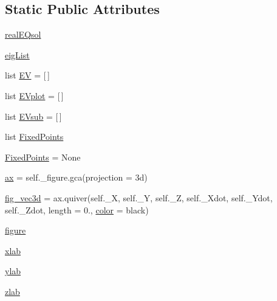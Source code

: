 \subsection*{Static Public Attributes}
\begin{DoxyCompactItemize}
\item 
\hyperlink{class_mu_mo_t_1_1_mu_mo_t_1_1_mu_mo_tvector_view_ab964c8e9f2533c9bf4957faf67de7149}{real\+E\+Qsol}
\item 
\hyperlink{class_mu_mo_t_1_1_mu_mo_t_1_1_mu_mo_tvector_view_ab5666bb0356c5bc211c10fd59723e892}{eig\+List}
\item 
list \hyperlink{class_mu_mo_t_1_1_mu_mo_t_1_1_mu_mo_tvector_view_ab56bd718f01a64e681a8135a8e90946a}{EV} = \mbox{[}$\,$\mbox{]}
\item 
list \hyperlink{class_mu_mo_t_1_1_mu_mo_t_1_1_mu_mo_tvector_view_a424471486fdcd104bad36c06ae6c8640}{E\+Vplot} = \mbox{[}$\,$\mbox{]}
\item 
list \hyperlink{class_mu_mo_t_1_1_mu_mo_t_1_1_mu_mo_tvector_view_a5b825ad4fea91f83e5f0df2bda4278f9}{E\+Vsub} = \mbox{[}$\,$\mbox{]}
\item 
list \hyperlink{class_mu_mo_t_1_1_mu_mo_t_1_1_mu_mo_tvector_view_aac20660098bbbe33ab90f9c880b2fa8c}{Fixed\+Points}
\item 
\hyperlink{class_mu_mo_t_1_1_mu_mo_t_1_1_mu_mo_tvector_view_a7a971a839d61106558ebf0453849cfd1}{Fixed\+Points} = None
\item 
\hyperlink{class_mu_mo_t_1_1_mu_mo_t_1_1_mu_mo_tvector_view_a8fa675eb2fcec5b95d9d21c670da7f30}{ax} = self.\+\_\+figure.\+gca(projection = \textquotesingle{}3d\textquotesingle{})
\item 
\hyperlink{class_mu_mo_t_1_1_mu_mo_t_1_1_mu_mo_tvector_view_a0d21a210e4f523569e4c57a12f80040c}{fig\+\_\+vec3d} = ax.\+quiver(self.\+\_\+X, self.\+\_\+Y, self.\+\_\+Z, self.\+\_\+\+Xdot, self.\+\_\+\+Ydot, self.\+\_\+\+Zdot, length = 0., \hyperlink{class_mu_mo_t_1_1_mu_mo_t_1_1_mu_mo_tview_a37dbdc30935031c05304482e1be89d8f}{color} = \textquotesingle{}black\textquotesingle{})
\item 
\hyperlink{class_mu_mo_t_1_1_mu_mo_t_1_1_mu_mo_tvector_view_a391e34f2de441d79152a7b3d6e4c9c86}{figure}
\item 
\hyperlink{class_mu_mo_t_1_1_mu_mo_t_1_1_mu_mo_tvector_view_abb76a7390100209788848dbd6bb9fe30}{xlab}
\item 
\hyperlink{class_mu_mo_t_1_1_mu_mo_t_1_1_mu_mo_tvector_view_a83433d4e45c13afe9a0042ae113ad169}{ylab}
\item 
\hyperlink{class_mu_mo_t_1_1_mu_mo_t_1_1_mu_mo_tvector_view_a180fbd5bd60d175c88a69e1dd3b0ed77}{zlab}

\end{DoxyCompactItemize}
